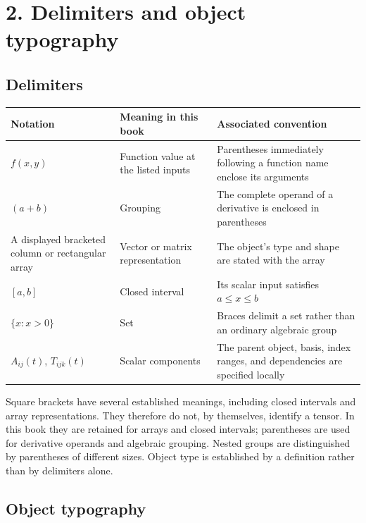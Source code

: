 \documentclass[11pt,oneside,openany]{book}
\begin{document}
\section{2. Delimiters and object typography}

\subsection{Delimiters}

\begingroup\small\setlength{\tabcolsep}{5pt}\renewcommand{\arraystretch}{1.15}
\begin{tabular}{@{}>{\raggedright\arraybackslash}p{}>{\raggedright\arraybackslash}p{}>{\raggedright\arraybackslash}p{}@{}}
\textbf{Notation} & \textbf{Meaning in this book} & \textbf{Associated convention} \\[5pt]
\hline
\(f(x,y)\) & Function value at the listed inputs & Parentheses immediately following a function name enclose its arguments \\[5pt]
\((a+b)\) & Grouping & The complete operand of a derivative is enclosed in parentheses \\[5pt]
A displayed bracketed column or rectangular array & Vector or matrix representation & The object's type and shape are stated with the array \\[5pt]
\([a,b]\) & Closed interval & Its scalar input satisfies \(a\leq x\leq b\) \\[5pt]
\(\{x:x>0\}\) & Set & Braces delimit a set rather than an ordinary algebraic group \\[5pt]
\(A_{ij}(t)\), \(T_{ijk}(t)\) & Scalar components & The parent object, basis, index ranges, and dependencies are specified locally \\[5pt]
\end{tabular}\endgroup

Square brackets have several established meanings, including closed intervals
and array representations. They therefore do not, by themselves, identify a
tensor. In this book they are retained for arrays and closed intervals;
parentheses are used for derivative operands and algebraic grouping. Nested
groups are distinguished by parentheses of different sizes. Object type is
established by a definition rather than by delimiters alone.
\clearpage

\subsection{Object typography}
\end{document}
